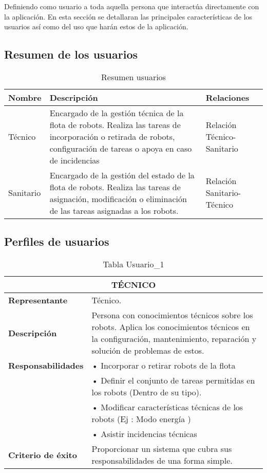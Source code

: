 \documentclass{scrreprt}
\begin{document}
Definiendo como usuario a toda aquella persona que interactúa directamente con la aplicación. En esta sección se detallaran las principales características de los usuarios así como del uso que harán estos de la aplicación. 

\begin{table}[H]
\subsection{Resumen de los usuarios}
\vspace{0.3cm}
\label{tab:my-table-user}

\begin{tabular}{ |p{2cm}|p{10cm}|p{3cm}|  }
\hline
 \textbf{Nombre} & \textbf{Descripción} & \textbf{Relaciones}\\
\hline
Técnico                        & Encargado de la gestión técnica de la flota de robots. Realiza las tareas de incorporación o retirada de robots, configuración de tareas o apoya en caso de incidencias & Relación Técnico-Sanitario \\ 
\hline
Sanitario                          & Encargado de la gestión del estado de la flota de robots. Realiza las tareas de asignación, modificación o eliminación de las tareas asignadas a los robots. & Relación Sanitario-Técnico  \\ 
\hline
\end{tabular}%

\caption{Resumen usuarios}
\end{table}

\subsection{Perfiles de usuarios}
\vspace{0.3cm}
\begin{table}[H]
\label{tab:my-table-user}
\begin{tabular}{|p{4cm}|p{11cm}|}
\hline
\multicolumn{2}{|c|}{\textbf{TÉCNICO}} \\ \hline
\textbf{Representante}                         & Técnico.  \\ \hline
\textbf{Descripción} &  Persona con conocimientos técnicos sobre los robots. Aplica los conocimientos técnicos en la configuración, mantenimiento, reparación y solución de problemas de estos. \\ \hline
\textbf{Responsabilidades}                         &  • Incorporar o retirar robots de la flota \\
 &  •	Definir el conjunto de tareas permitidas en los robots (Dentro de su tipo). \\
 & •	Modificar características técnicas de los robots (Ej : Modo energía )  \\ 
 & •	Asistir incidencias técnicas \\
 \hline
\textbf{Criterio de éxito}                         & Proporcionar un sistema que cubra sus responsabilidades de una forma simple.  \\ \hline
\end{tabular}%

\caption{Tabla Usuario_1}
\end{table}
\end{document}
